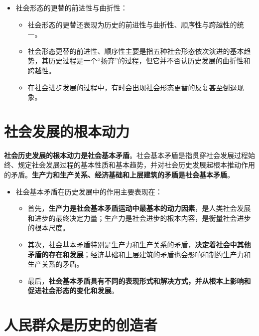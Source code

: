 \documentclass[12pt,openany]{ctexbook}
\begin{document}
\begin{itemize}
\begin{itemize}
\begin{itemize}
  \item 人们的历史选择性归根结底是人民群众的选择性。人们对于社会形态的历史选择最终取决于人民群众的根本利益、根本意愿以及对社会发展规律的把握和顺应程度。
\end{itemize}
  \item 社会形态的更替的前进性与曲折性：
\begin{itemize}
  \item 社会形态的更替还表现为历史的前进性与曲折性、顺序性与跨越性的统一。
  \item 社会形态更替的前进性、顺序性主要是指五种社会形态依次演进的基本趋势，其历史过程是一个“扬弃”的过程，但它并不否认历史发展的曲折性和跨越性。
  \item 在社会进步发展的过程中，有时会出现社会形态更替的反复甚至倒退现象。
\end{itemize}
\end{itemize}
\end{itemize}
\section{社会发展的根本动力}
\textbf{社会历史发展的根本动力是社会基本矛盾}。社会基本矛盾是指贯穿社会发展过程始终、规定社会发展过程的基本性质和基本趋势，并对社会历史发展起根本推动作用的矛盾。\textbf{生产力和生产关系、经济基础和上层建筑的矛盾是社会基本矛盾}。
\begin{itemize}
  \item 社会基本矛盾在历史发展中的作用主要表现在：
\begin{itemize}
  \item 首先，\textbf{生产力是社会基本矛盾运动中最基本的动力因素}，是人类社会发展和进步的最终决定力量；生产力是社会进步的根本内容，是衡量社会进步的根本尺度。
  \item 其次，社会基本矛盾特别是生产力和生产关系的矛盾，\textbf{决定着社会中其他矛盾的存在和发展}；经济基础和上层建筑的矛盾也会影响和制约生产力和生产关系的矛盾。
  \item 最后，\textbf{社会基本矛盾具有不同的表现形式和解决方式，并从根本上影响和促进社会形态的变化和发展}。
\end{itemize}
\end{itemize}
\section{人民群众是历史的创造者}
\end{document}
